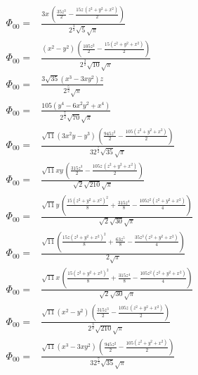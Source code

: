 \documentclass[10pt]{article}
\begin{document}
\begin{align*}
\Phi_{00} = &\frac{3 x\, \left( \frac{35 {{z}^{3}}}{2}-\frac{15 z\, \left( {{z}^{2}}+{{y}^{2}}+{{x}^{2}}\right) }{2}\right) }{{{2}^{\frac{3}{2}}} \sqrt{5} \sqrt{\ensuremath{\pi} }}\\
\Phi_{00} = &\frac{\left( {{x}^{2}}-{{y}^{2}}\right) \, \left( \frac{105 {{z}^{2}}}{2}-\frac{15 \left( {{z}^{2}}+{{y}^{2}}+{{x}^{2}}\right) }{2}\right) }{{{2}^{\frac{3}{2}}} \sqrt{10} \sqrt{\ensuremath{\pi} }}\\
\Phi_{00} = &\frac{3 \sqrt{35} \left( {{x}^{3}}-3 x {{y}^{2}}\right)  z}{{{2}^{\frac{5}{2}}} \sqrt{\ensuremath{\pi} }}\\
\Phi_{00} = &\frac{105 \left( {{y}^{4}}-6 {{x}^{2}} {{y}^{2}}+{{x}^{4}}\right) }{{{2}^{\frac{7}{2}}} \sqrt{70} \sqrt{\ensuremath{\pi} }}\\
%
\Phi_{00} = &\frac{\sqrt{11} \left( 3 {{x}^{2}} y-{{y}^{3}}\right) \, \left( \frac{945 {{z}^{2}}}{2}-\frac{105 \left( {{z}^{2}}+{{y}^{2}}+{{x}^{2}}\right) }{2}\right) }{3 {{2}^{\frac{7}{2}}} \sqrt{35} \sqrt{\ensuremath{\pi} }}\\
\Phi_{00} = &\frac{\sqrt{11} x y\, \left( \frac{315 {{z}^{3}}}{2}-\frac{105 z\, \left( {{z}^{2}}+{{y}^{2}}+{{x}^{2}}\right) }{2}\right) }{\sqrt{2} \sqrt{210} \sqrt{\ensuremath{\pi} }}\\
\Phi_{00} = &\frac{\sqrt{11} y\, \left( \frac{15 {{\left( {{z}^{2}}+{{y}^{2}}+{{x}^{2}}\right) }^{2}}}{8}+\frac{315 {{z}^{4}}}{8}-\frac{105 {{z}^{2}} \left( {{z}^{2}}+{{y}^{2}}+{{x}^{2}}\right) }{4}\right) }{\sqrt{2} \sqrt{30} \sqrt{\ensuremath{\pi} }}\\
\Phi_{00} = &\frac{\sqrt{11} \left( \frac{15 z {{\left( {{z}^{2}}+{{y}^{2}}+{{x}^{2}}\right) }^{2}}}{8}+\frac{63 {{z}^{5}}}{8}-\frac{35 {{z}^{3}} \left( {{z}^{2}}+{{y}^{2}}+{{x}^{2}}\right) }{4}\right) }{2 \sqrt{\ensuremath{\pi} }}\\
\Phi_{00} = &\frac{\sqrt{11} x\, \left( \frac{15 {{\left( {{z}^{2}}+{{y}^{2}}+{{x}^{2}}\right) }^{2}}}{8}+\frac{315 {{z}^{4}}}{8}-\frac{105 {{z}^{2}} \left( {{z}^{2}}+{{y}^{2}}+{{x}^{2}}\right) }{4}\right) }{\sqrt{2} \sqrt{30} \sqrt{\ensuremath{\pi} }}\\
\Phi_{00} = &\frac{\sqrt{11} \left( {{x}^{2}}-{{y}^{2}}\right) \, \left( \frac{315 {{z}^{3}}}{2}-\frac{105 z\, \left( {{z}^{2}}+{{y}^{2}}+{{x}^{2}}\right) }{2}\right) }{{{2}^{\frac{3}{2}}} \sqrt{210} \sqrt{\ensuremath{\pi} }}\\
\Phi_{00} = &\frac{\sqrt{11} \left( {{x}^{3}}-3 x {{y}^{2}}\right) \, \left( \frac{945 {{z}^{2}}}{2}-\frac{105 \left( {{z}^{2}}+{{y}^{2}}+{{x}^{2}}\right) }{2}\right) }{3 {{2}^{\frac{7}{2}}} \sqrt{35} \sqrt{\ensuremath{\pi} }}\\

\end{align*}
\end{document}
